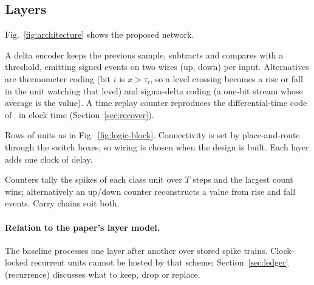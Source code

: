 \subsection{Layers}
Fig.~\ref{fig:architecture} shows the proposed network.
\begin{description}[leftmargin=1.5em,style=nextline]
\item[Input layer (multi-bit).] A delta encoder keeps the previous sample, subtracts and compares with a threshold, emitting signed events on two wires (up, down) per input. Alternatives are thermometer coding (bit $i$ is $x>\tau_i$, so a level crossing becomes a rise or fall in the unit watching that level) and sigma-delta coding (a one-bit stream whose average is the value). A time replay counter reproduces the differential-time code of~\cite{windhager2024} in clock time (Section~\ref{sec:recover}).
\item[Hidden layers (logic blocks).] Rows of units as in Fig.~\ref{fig:logic-block}. Connectivity is set by place-and-route through the switch boxes, so wiring is chosen when the design is built. Each layer adds one clock of delay.
\item[Output layer (multi-bit).] Counters tally the spikes of each class unit over $T$ steps and the largest count wins; alternatively an up/down counter reconstructs a value from rise and fall events. Carry chains suit both.
\end{description}

\paragraph{Relation to the paper's layer model.} The baseline processes one layer after another over stored spike trains. Clock-locked recurrent units cannot be hosted by that scheme; Section~\ref{sec:ledger} (recurrence) discusses what to keep, drop or replace.




